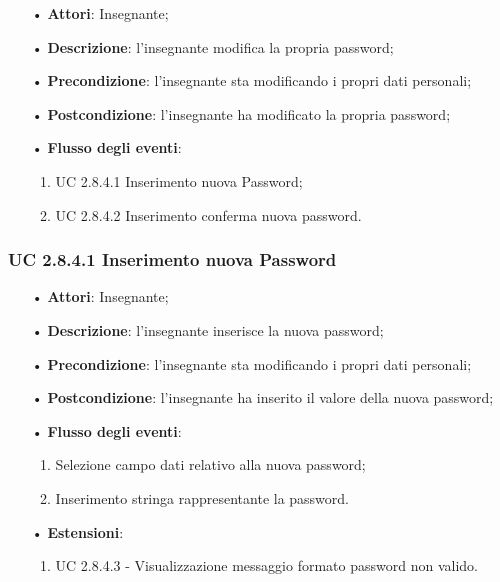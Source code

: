 \begin{itemize}
	\item[•]\textbf{Attori}: Insegnante;
	\item[•]\textbf{Descrizione}: l'insegnante modifica la propria password;
	\item[•]\textbf{Precondizione}: l'insegnante sta modificando i propri dati personali;
	\item[•]\textbf{Postcondizione}: l'insegnante ha modificato la propria password; 
	\item[•]\textbf{Flusso degli eventi}: 
	\begin{enumerate}
		\item UC 2.8.4.1 Inserimento nuova Password;
		\item UC 2.8.4.2 Inserimento conferma nuova password.
	\end{enumerate}
\end{itemize}

\subsubsection{UC 2.8.4.1 Inserimento nuova Password}
\begin{itemize}
	\item[•]\textbf{Attori}: Insegnante;
	\item[•]\textbf{Descrizione}: l'insegnante inserisce la nuova password;
	\item[•]\textbf{Precondizione}: l'insegnante sta modificando i propri dati personali;
	\item[•]\textbf{Postcondizione}: l'insegnante ha inserito il valore della nuova password; 
	\item[•]\textbf{Flusso degli eventi}: 
	\begin{enumerate}
		\item Selezione campo dati relativo alla nuova password;
		\item Inserimento stringa rappresentante la password.
	\end{enumerate}
	\item[•]\textbf{Estensioni}:
	\begin{enumerate}
		\item UC 2.8.4.3 - Visualizzazione messaggio formato password non valido.
	\end{enumerate}
\end{itemize}

